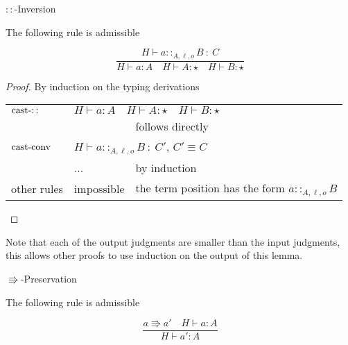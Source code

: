 \begin{lem}
$::$-Inversion

The following rule is admissible
\end{lem}

\[
\frac{H\vdash a::_{A,\ell ,o}B\::\:C}{H\vdash a:A\quad H\vdash A:\star\quad H\vdash B:\star}
\]

\begin{proof}
By induction on the typing derivations

\begin{tabular}{lll}
$\operatorname{cast-::}$ & \multicolumn{2}{l}{$H\vdash a:A\quad H\vdash A:\star\quad H\vdash B:\star$}\tabularnewline
 &  & follows directly\tabularnewline
$\operatorname{cast-conv}$ & \multicolumn{2}{l}{$H\vdash a::_{A,\ell ,o}B\::\:C'$, $C'\equiv C$}\tabularnewline
 & ... & by induction\tabularnewline
other rules & impossible & the term position has the form $a::_{A,\ell ,o}B$\tabularnewline
\end{tabular}
\end{proof}
Note that each of the output judgments are smaller than the input judgments, this allows other proofs to use induction on the output of this lemma.
\begin{thm}
$\Rrightarrow$-Preservation 

The following rule is admissible

\[
\frac{a\Rrightarrow a'\quad H\vdash a:A}{H\vdash a':A}
\]
\end{thm}

